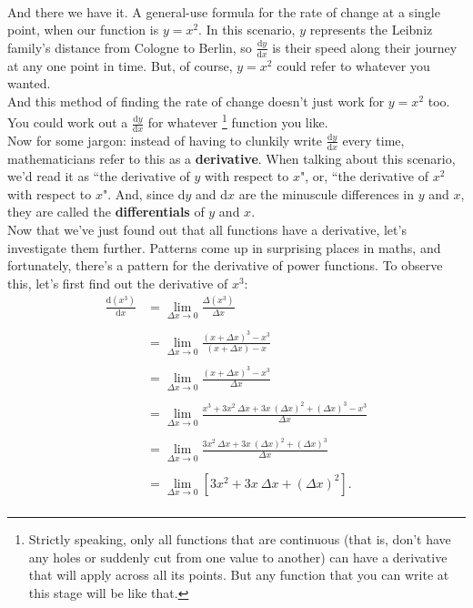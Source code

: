 \documentclass[11pt]{article}
\numberwithin{equation}{section}
\begin{document}
\\ And there we have it. A general-use formula for the rate of change at a single point, when our function is \(y = x^2\). In this scenario, \(y\) represents the Leibniz family's distance from Cologne to Berlin, so \(\frac{\textrm{d}y}{\textrm{d}x}\) is their speed along their journey at any one point in time. But, of course, \(y = x^2\) could refer to whatever you wanted. 
\\ And this method of finding the rate of change doesn't just work for \(y = x^2\) too. You could work out a \(\frac{\textrm{d}y}{\textrm{d}x}\) for whatever \footnote{Strictly speaking, only all functions that are continuous (that is, don't have any holes or suddenly cut from one value to another) can have a derivative that will apply across all its points. But any function that you can write at this stage will be like that.} function you like. 
\\ Now for some jargon: instead of having to clunkily write \(\frac{\textrm{d}y}{\textrm{d}x}\) every time, mathematicians refer to this as a \textbf{derivative}. When talking about this scenario, we'd read it as ``the derivative of \(y\) with respect to \(x\)", or, ``the derivative of \(x^2\) with respect to \(x\)". And, since d\(y\) and d\(x\) are the minuscule differences in \(y\) and \(x\), they are called the \textbf{differentials} of \(y\) and \(x\).
\\ Now that we've just found out that all functions have a derivative, let's investigate them further. Patterns come up in surprising places in maths, and fortunately, there's a pattern for the derivative of power functions. To observe this, let's first find out the derivative of \(x^3\):
\begin{align*}
\frac{\textrm{d}(x^3)}{\textrm{d}x} &= \lim_{\Delta x \to 0} \frac{\Delta (x^3)}{\Delta x} \\ \\
&= \lim_{\Delta x \to 0} \frac{(x + \Delta x)^3 - x^3}{(x + \Delta x) - x} \\ \\
&= \lim_{\Delta x \to 0} \frac{(x + \Delta x)^3 - x^3}{\Delta x} \\ \\
&= \lim_{\Delta x \to 0} \frac{x^3 + 3 x^2 \ \Delta x + 3x \ (\Delta x)^2 + (\Delta x)^3 - x^3}{\Delta x} \\ \\
&= \lim_{\Delta x \to 0} \frac{3x^2 \ \Delta x + 3x \ (\Delta x)^2 + (\Delta x)^3}{\Delta x} \\ \\
&= \lim_{\Delta x \to 0} \left[ 3x^2 + 3x \ \Delta x + (\Delta x)^2 \right]. \\
\end{align*}
\end{document}
